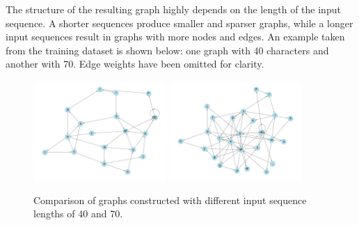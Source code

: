 The structure of the resulting graph highly depends on the length of the input sequence. A shorter sequences produce smaller and sparser graphs, while a longer input sequences result in graphs with more nodes and edges. An example taken from the training dataset is shown below: one graph with 40 characters and another with 70. Edge weights have been omitted for clarity.

\begin{figure}[H]
	\centering
	\includegraphics[width=0.45\textwidth]{images/len40_graph_other_layout.png}
	\includegraphics[width=0.45\textwidth]{images/len70_graph_other_layout.png}
	\caption{Comparison of graphs constructed with different input sequence lengths of 40 and 70.}%
	\label{fig:multiple graphs}%
\end{figure}



